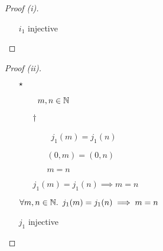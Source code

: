 \begin{prop}
\begin{proof}[Proof (i)]
\begin{itemize}
        \item[\iffs]
          $i_1$ injective
          \qedhere
    \end{itemize}
  \end{proof}

  \begin{proof}[Proof (ii)]~\\
    \begin{itemize}
      \item[$\star$]
        \begin{itemize}
          \item[\phs]\Let~$m,n\in\mathbb{N}$
            \marginnote{\Hyp}

          \item[$\dagger$]
            \begin{itemize}
              \item[\phantom{\imps}]\Ass~$j_1(m) = j_1(n)$
                \marginnote{\Hyp}

              \item[\iffs]
                $(0,m) = (0,n)$

              \item[\iffs] $m = n$
            \end{itemize}
            \item[\imps]
              $j_1(m) = j_1(n) \implies m = n$
              \marginnote{\imps-\Intro-$\dagger$}
        \end{itemize}

        \item[\imps]
          $\forall m,n\in\mathbb{N}\ldotp~j_1(m) = j_1(n) \implies m = n$
          \marginnote{$\forall$-\Intro-$\star$}

        \item[\iffs]
          $j_1$ injective
          \qedhere
    \end{itemize}
  \end{proof}
\end{prop}

